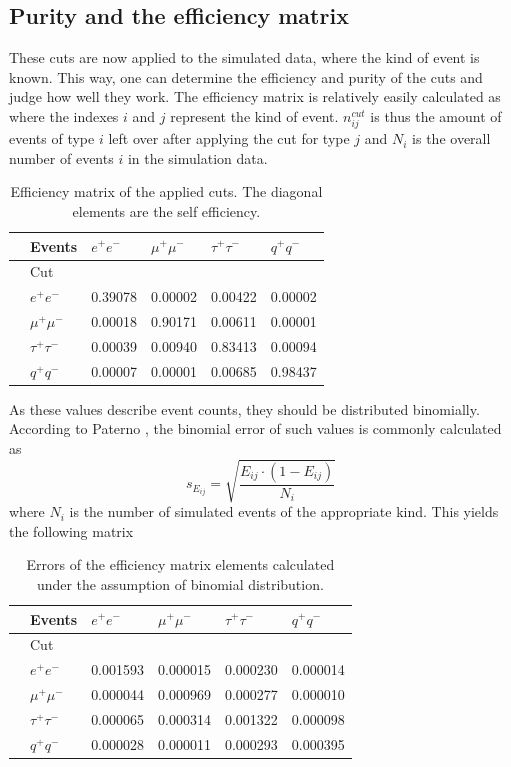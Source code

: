 \subsection{Purity and the efficiency matrix}
These cuts are now applied to the simulated data, where the kind of event is known. This way, one can determine the efficiency and purity of the cuts and judge how well they work. 
The efficiency matrix is relatively easily calculated as
\begin{equation}
\end{equation}
where the indexes $i$ and $j$ represent the kind of event. $n_{ij}^{cut}$ is thus the amount of events of type $i$ left over after applying the cut for type $j$ and $N_i$ is the overall number of events $i$ in the simulation data.
\begin{table}[H]\centering
	\begin{tabular}{@{}llllll@{}}
		\toprule
		&Events &$e^+e^-$&$\mu^+\mu^-$&$\tau^+\tau^-$&$q^+q^-$\\
		\midrule
		&Cut&&&&\\
		&$e^+e^-$&0.39078&0.00002&0.00422&0.00002\\
		&$\mu^+\mu^-$&0.00018&0.90171&0.00611&0.00001\\
		&$\tau^+\tau^-$&0.00039&0.00940&0.83413&0.00094\\
		&$q^+q^-$&0.00007&0.00001&0.00685&0.98437\\
	\end{tabular}
	\caption[Efficiency matrix]{Efficiency matrix of the applied cuts. The diagonal elements are the self efficiency.}
	\label{tb:efficiency}
\end{table}

As these values describe event counts, they should be distributed binomially. According to Paterno \cite{binpaper}, the binomial error of such values is commonly calculated as
\begin{equation}
s_{E_{ij}}=\sqrt{\frac{E_{ij}\cdot(1-E_{ij})}{N_i}}
\end{equation}
where $N_i$ is the number of simulated events of the appropriate kind. This yields the following matrix

\begin{table}[H]\centering
	\begin{tabular}{@{}llllll@{}}
		\toprule
		&Events &$e^+e^-$&$\mu^+\mu^-$&$\tau^+\tau^-$&$q^+q^-$\\
		\midrule
		&Cut&&&&\\
		&$e^+e^-$&0.001593&0.000015&0.000230&0.000014\\
		&$\mu^+\mu^-$&0.000044&0.000969&0.000277&0.000010\\
		&$\tau^+\tau^-$&0.000065&0.000314&0.001322&0.000098\\
		&$q^+q^-$&0.000028&0.000011&0.000293&0.000395\\
		\bottomrule
	\end{tabular}
	\caption[Efficiency error matrix]{Errors of the efficiency matrix elements calculated under the assumption of binomial distribution.}
	\label{tb:efficiencyerr}
\end{table}

